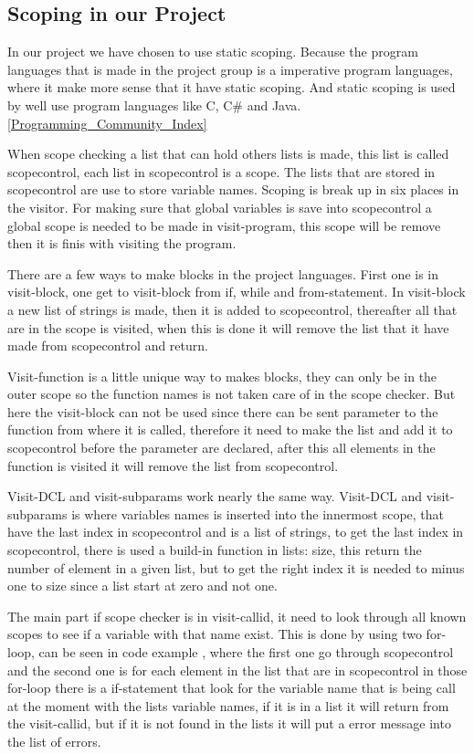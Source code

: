 \subsection{Scoping in our Project}
In our project we have chosen to use static scoping. Because the program languages that is made in the project group is a imperative program languages, where it make more sense that it have static scoping. And static scoping is used by well use program languages like C, C# and Java. \ref{Programming_Community_Index}

When scope checking a list that can hold others lists is made, this list is called scopecontrol, each list in scopecontrol is a scope. The lists that are stored in scopecontrol are use to store variable names. Scoping is break up in six places in the visitor. For making sure that global variables is save into scopecontrol a global scope is needed to be made in visit-program, this scope will be remove then it is finis with visiting the program.

There are a few ways to make blocks in the project languages. First one is in visit-block, one get to visit-block from if, while and from-statement. In visit-block a new list of strings is made, then it is added to scopecontrol, thereafter all that are in the scope is visited, when this is done it will remove the list that it have made from scopecontrol and return.

Visit-function is a little unique way to makes blocks, they can only be in the outer scope so the function names is not taken care of in the scope checker. But here the visit-block can not be used since there can be sent parameter to the function from where it is called, therefore it need to make the list and add it to scopecontrol before the parameter are declared, after this all elements in the function is visited it will remove the list from scopecontrol.

Visit-DCL and visit-subparams work nearly the same way. Visit-DCL and visit-subparams is where variables names is inserted into the innermost scope, that have the last index in scopecontrol and is a list of strings, to get the last index in scopecontrol, there is used a build-in function in lists: size, this return the number of element in a given list, but to get the right index it is needed to minus one to size since a list start at zero and not one.

The main part if scope checker is in visit-callid, it need to look through all known scopes to see if a variable with that name exist. This is done by using two for-loop, can be seen in code example , where the first one go through scopecontrol and the second one is for each element in the list that are in scopecontrol in those for-loop there is a if-statement that look for the variable name that is being call at the moment with the lists variable names, if it is in a list it will return from the visit-callid, but if it is not found in the lists it will put a error message into the list of errors.

